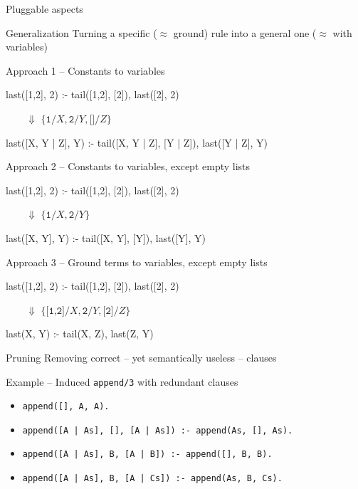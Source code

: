 \documentclass[presentation]{beamer}\mode<presentation>{\usetheme{AMSBolognaFC}}
\begin{document}
\begin{frame}[allowframebreaks]{Pluggable aspects}
    \begin{block}{Generalization}
        Turning a specific ($\approx$ ground) rule into a general one ($\approx$ with variables)
    \end{block}
    \begin{exampleblock}{Approach 1 -- Constants to variables}
        \begin{center}\ttfamily\small
            last([1,2], 2) :- tail([1,2], [2]), last([2], 2)

            $\qquad \Downarrow$ {\footnotesize $\{ \texttt{1}/X, \texttt{2}/Y, \texttt{[]}/Z \}$}

            last([X, Y | Z], Y) :- tail([X, Y | Z], [Y | Z]), last([Y | Z], Y)
        \end{center}
    \end{exampleblock}
    \framebreak
    \begin{exampleblock}{Approach 2 -- Constants to variables, except empty lists}
        \begin{center}\ttfamily\small
            last([1,2], 2) :- tail([1,2], [2]), last([2], 2)

            $\qquad \Downarrow$ {\footnotesize $\{ \texttt{1}/X, \texttt{2}/Y \}$}

            last([X, Y], Y) :- tail([X, Y], [Y]), last([Y], Y)
        \end{center}
    \end{exampleblock}
    \begin{exampleblock}{Approach 3 -- Ground terms to variables, except empty lists}
        \begin{center}\ttfamily\small
            last([1,2], 2) :- tail([1,2], [2]), last([2], 2)

            $\qquad \Downarrow$ {\footnotesize $\{ \texttt{[1,2]}/X, \texttt{2}/Y, \texttt{[2]}/Z \}$}

            last(X, Y) :- tail(X, Z), last(Z, Y)
        \end{center}
    \end{exampleblock}

    \framebreak

    \begin{block}{Pruning}
        Removing correct -- yet semantically useless -- clauses
    \end{block}

	\begin{exampleblock}{Example -- Induced \texttt{append/3} with redundant clauses}\scriptsize
        \begin{itemize}
            \item \texttt{append([], A, A).}
            \item \alert{\texttt{append([A | As], [], [A | As]) :- append(As, [], As).}}
            \item \alert{\texttt{append([A | As], B, [A | B]) :- append([], B, B).}}
            \item \texttt{append([A | As], B, [A | Cs]) :- append(As, B, Cs).}
        \end{itemize}
    \end{exampleblock}


\end{frame}
\end{document}
